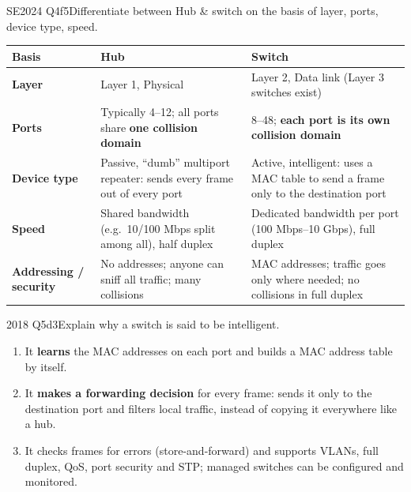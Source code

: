 \documentclass[10pt]{article}
\begin{document}
\begin{pastq}{SE2024 Q4f}{5}Differentiate between Hub \& switch on the basis of layer, ports, device type, speed.\end{pastq}
\begin{ans}
\small
\begin{tabularx}{\linewidth}{@{}>{\bfseries}p{2.1cm}XX@{}}
\toprule
Basis & Hub & Switch\\\midrule
Layer & Layer 1, Physical & Layer 2, Data link (Layer 3 switches exist)\\
Ports & Typically 4--12; all ports share \textbf{one collision domain} & 8--48; \textbf{each port is its own collision domain}\\
Device type & Passive, ``dumb'' multiport repeater: sends every frame out of every port & Active, intelligent: uses a MAC table to send a frame only to the destination port\\
Speed & Shared bandwidth (e.g.\ 10/100 Mbps split among all), half duplex & Dedicated bandwidth per port (100 Mbps--10 Gbps), full duplex\\
Addressing / security & No addresses; anyone can sniff all traffic; many collisions & MAC addresses; traffic goes only where needed; no collisions in full duplex\\
\bottomrule
\end{tabularx}
\end{ans}

\begin{pastq}{2018 Q5d}{3}Explain why a switch is said to be intelligent.\end{pastq}
\begin{ans}
\begin{enumerate}
\item It \textbf{learns} the MAC addresses on each port and builds a MAC address table by itself.
\item It \textbf{makes a forwarding decision} for every frame: sends it only to the destination port and filters local traffic, instead of copying it everywhere like a hub.
\item It checks frames for errors (store-and-forward) and supports VLANs, full duplex, QoS, port security and STP; managed switches can be configured and monitored.
\end{enumerate}
\end{ans}
\end{document}
